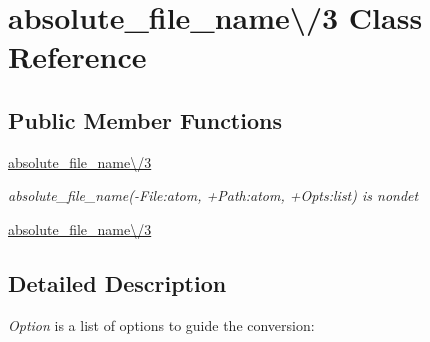 \section{absolute\+\_\+file\+\_\+name\textbackslash{}/3 Class Reference}
\label{classabsolute__file__name_0C_23}
\subsection*{Public Member Functions}
\begin{DoxyCompactItemize}
\item 
\hyperlink{classabsolute__file__name_0C_23_afa8bd7fdb11c3ed50d6f3c079164ee62}{absolute\+\_\+file\+\_\+name\textbackslash{}/3}
\begin{DoxyCompactList}\small\item\em absolute\+\_\+file\+\_\+name(-\/\+File\+:atom, +\+Path\+:atom, +\+Opts\+:list) is nondet \end{DoxyCompactList}\item 
\hyperlink{classabsolute__file__name_0C_23_afa8bd7fdb11c3ed50d6f3c079164ee62}{absolute\+\_\+file\+\_\+name\textbackslash{}/3}
\end{DoxyCompactItemize}


\subsection{Detailed Description}
{\itshape Option} is a list of options to guide the conversion\+:


